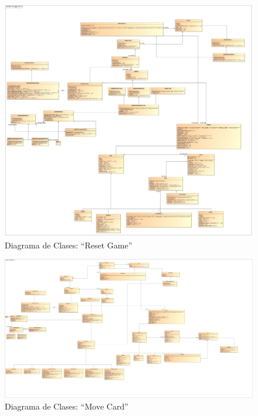 \documentclass[11pt]{article}
\begin{document}
\begin{landscape}
\begin{center}
 \begin{figure}[H]
 \begin{center}
 \includegraphics[scale=0.22]{Analysis/ResetGame00.jpg}
   \caption{Diagrama de Clases: ``Reset Game''}
   \label{fig:resetgame}
 \end{center}
 \end{figure}
\end{center}
\end{landscape}
\restoregeometry

\begin{landscape}
\begin{center}
 \begin{figure}[H]
 \begin{center}
 \includegraphics[scale=0.18]{Analysis/MoveCard00.jpg}
   \caption{Diagrama de Clases: ``Move Card''}
   \label{fig:movecard}
 \end{center}
 \end{figure}
\end{center}
\end{landscape}
\restoregeometry
\end{document}
